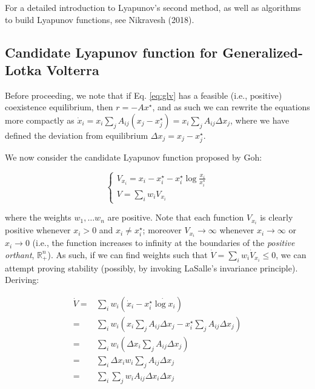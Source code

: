 \documentclass{article}
\begin{document}
For a detailed introduction to Lyapunov's second method, as well as
algorithms to build Lyapunov functions, see Nikravesh (2018).

\hypertarget{candidate-lyapunov-function-for-generalized-lotka-volterra}{%
\subsection{Candidate Lyapunov function for Generalized-Lotka
Volterra}\label{candidate-lyapunov-function-for-generalized-lotka-volterra}}

Before proceeding, we note that if Eq. \ref{eq:glv} has a feasible
(i.e., positive) coexistence equilibrium, then \(r = -A x^\star\), and
as such we can rewrite the equations more compactly as
\(\dot{x}_i = x_i \sum_{j} A_{ij} (x_j - x_j^\star) = x_i \sum_{j} A_{ij} \Delta x_j\),
where we have defined the deviation from equilibrium
\(\Delta x_j = x_j - x_j^\star\).

We now consider the candidate Lyapunov function proposed by Goh:

\begin{equation}
\label{eq:goh}
\begin{cases}
V_{x_i} = x_i - x_i^\star - x_i^\star \log \frac{x_i}{x_i^\star}\\
V = \sum_i w_i V_{x_i}
\end{cases}
\end{equation}

where the weights \(w_1, \ldots w_n\) are positive. Note that each
function \(V_{x_i}\) is clearly positive whenever \(x_i > 0\) and
\(x_i \neq x_i^\star\); moreover \(V_{x_i} \to \infty\) whenever
\(x_i \to \infty\) or \(x_i \to 0\) (i.e., the function increases to
infinity at the boundaries of the \emph{positive orthant},
\(\mathbb R^n_+\)). As such, if we can find weights such that
\(\dot{V} = \sum_i w_i \dot{V}_{x_i} \leq 0\), we can attempt proving
stability (possibly, by invoking LaSalle's invariance principle).
Deriving:

\begin{equation}
\label{eq:gohstab}
\begin{aligned}
\dot{V} =& \sum_i w_i \left(\dot{x}_i - x_i^\star \dot{\log x_i} \right)\\
 =& \sum_i w_i \left(x_i \sum_{j} A_{ij} \Delta x_j - x_i^\star \sum_j A_{ij} \Delta x_j \right)\\
 =& \sum_i w_i \left(\Delta x_i \sum_{j} A_{ij} \Delta x_j \right)\\
 =& \sum_i \Delta x_i w_i \sum_j A_{ij} \Delta x_j\\
 =& \sum_i \sum_j w_i A_{ij} \Delta x_i \Delta x_j
\end{aligned}
\end{equation}
\end{document}
